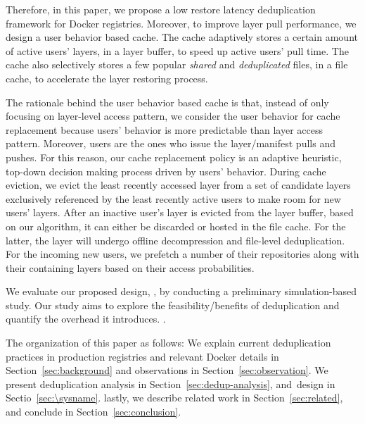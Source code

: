 Therefore, in this paper, we propose a low restore latency %
 deduplication framework for Docker registries. 
Moreover, to improve layer pull performance, we design a user behavior based cache. 
The cache adaptively stores a certain amount of active users' layers, in a layer buffer, to speed up active users' pull time. 
The cache also selectively stores a few popular \textit{shared} and \textit{deduplicated} files, in a file cache, to accelerate the layer restoring process. 

The rationale behind the user behavior based cache is that, instead of only focusing on layer-level access pattern, 
we consider the user behavior for cache replacement because users' behavior is more predictable than layer access pattern. 
Moreover, users are the ones who issue the layer/manifest pulls and pushes.  
For this reason, our cache replacement policy is an adaptive heuristic, top-down decision making process driven by users' behavior.
During cache eviction, we evict the least recently accessed layer from a set of candidate layers exclusively referenced by the least recently active users to make room for new users' layers. 
After an inactive user's layer is evicted from the layer buffer, based on our algorithm, it can either be discarded or hosted in the file cache. For the latter, the layer will undergo offline decompression and file-level deduplication.
For the incoming new users, we prefetch a number of their repositories along with their containing layers based on their access probabilities.

We evaluate our proposed design, \sysname, 
by conducting a preliminary simulation-based study. Our study aims to explore the feasibility/benefits of deduplication and quantify the overhead it introduces.
.  




The organization of this paper as follows: 
We explain current deduplication practices in production registries and relevant Docker details in Section~\ref{sec:background} and observations in Section~\ref{sec:observation}. 
We present deduplication analysis in
Section~\ref{sec:dedup-analysis}, and~\sysname design in Sectio~\ref{sec:\sysname}. lastly, we describe related work in Section~\ref{sec:related},
and conclude in Section~\ref{sec:conclusion}.



